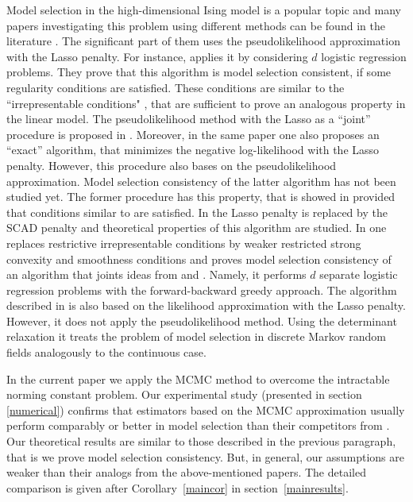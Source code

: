 \documentclass[twoside,11pt]{article}
\begin{document}
Model selection in the high-dimensional Ising model is a popular topic and many papers investigating this problem using different methods can be found in the 
literature \citep{banerjee08, bresler08, Lee06, Ravi10,HofTib09, Guoetal10,Xueetal12,  Jalali11}. 
The significant part of them uses  the pseudolikelihood approximation  with the Lasso penalty. For instance, \citet{Ravi10} applies 
it by considering $d$ logistic regression problems. They prove that this algorithm is model selection consistent, if some regularity conditions are satisfied. 
These conditions are similar to the ``irrepresentable conditions" \citep{zhaoYu06}, that are sufficient to prove an analogous property in the linear model. 
The pseudolikelihood method with the Lasso as a ``joint'' procedure is proposed in \citet{HofTib09}. Moreover, in the same paper one also proposes an ``exact'' algorithm,
that minimizes the negative log-likelihood with the Lasso penalty.
However, this procedure also bases on the pseudolikelihood approximation. Model selection consistency of the latter algorithm has not been studied yet. 
The former procedure has this property, that is showed in \citet{Guoetal10} provided that  conditions similar to \citet{Ravi10} are satisfied.  
In \citet{Xueetal12} the Lasso penalty is replaced by the SCAD penalty \citep{FanLi2001} and theoretical properties of this algorithm are studied. In \citet{Jalali11} one replaces restrictive irrepresentable conditions by weaker restricted strong convexity and smoothness conditions \citep{negahban12} and proves model selection consistency of an algorithm that joints ideas from \citet{Ravi10} and \citet{zhangt09}. Namely, it performs $d$ separate logistic regression problems with the forward-backward greedy approach.  The algorithm described in \citet{banerjee08} is also based on the likelihood approximation with the Lasso penalty. However, it does not apply the pseudolikelihood method. Using the determinant relaxation \citep{WainJord06} it treats the problem of model selection in discrete Markov random fields analogously to the continuous case.

In the current paper we apply the MCMC method to overcome the intractable norming constant problem. 
Our experimental study (presented in section \ref{numerical}) confirms 
that estimators based on the MCMC approximation usually perform comparably or better in model selection than their competitors from \citet{banerjee08, HofTib09, Ravi10}.
Our theoretical results are similar to  those described in the previous paragraph, that is we prove model selection consistency. But, in general, our assumptions are weaker than their analogs from the above-mentioned papers. 
The detailed comparison is given after Corollary~\ref{maincor} in section~\ref{mainresults}. 
\end{document}
